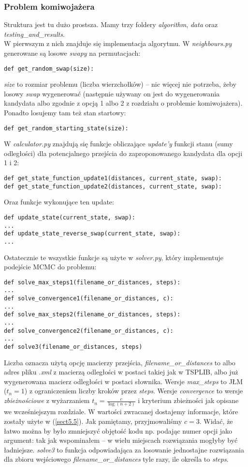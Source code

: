 \documentclass[a4paper]{article}
\theoremstyle{defn}
\theoremstyle{theorem}
\theoremstyle{lemma}
\theoremstyle{cor}
\theoremstyle{fact}
\begin{document}
\subsubsection{Problem komiwojażera}
Struktura jest tu dużo prostsza. Mamy trzy foldery \textit{algorithm}, \textit{data} oraz \textit{testing\_and\_results}.\\
W pierwszym z nich znajduje się implementacja algorytmu. W \textit{neighbours.py} generowane są losowe \textit{swapy} na permutacjach:
\begin{lstlisting}
def get_random_swap(size):
\end{lstlisting}
\textit{size} to rozmiar problemu (liczba wierzchołków) – nic więcej nie potrzeba, żeby losowy \textit{swap} wygenerować (następnie używany on jest do wygenerowania kandydata albo zgodnie z opcją 1 albo 2 z rozdziału o problemie komiwojażera). Ponadto losujemy tam też stan startowy:
\begin{lstlisting}
def get_random_starting_state(size):
\end{lstlisting}
W \textit{calculator.py} znajdują się funkcje obliczające \textit{update'y} funkcji stanu (sumy odległości) dla potencjalnego przejścia do zaproponowanego kandydata dla opcji 1 i 2:
\begin{lstlisting}
def get_state_function_update1(distances, current_state, swap):
def get_state_function_update2(distances, current_state, swap):
\end{lstlisting}
Oraz funkcje wykonujące ten update:
\begin{lstlisting}
def update_state(current_state, swap):
...
def update_state_reverse_swap(current_state, swap):
...
\end{lstlisting}
Ostatecznie te wszystkie funkcje są użyte w \textit{solver.py}, który implementuje podejście MCMC do problemu:
\begin{lstlisting}
def solve_max_steps1(filename_or_distances, steps):
...
def solve_convergence1(filename_or_distances, c):
...
def solve_max_steps2(filename_or_distances, steps):
...
def solve_convergence2(filename_or_distances, c):
...
def solve3(filename_or_distances, steps)
\end{lstlisting}
Liczba oznacza użytą opcję macierzy przejścia, \textit{filename\_or\_distances} to albo adres pliku \textit{.xml} z macierzą odległości w postaci takiej jak w TSPLIB, albo już wygenerowana macierz odległości w postaci słownika. Wersje \textit{max\_steps} to JŁM ($t_n=1$) z ograniczeniem liczby kroków przez \textit{steps}. Wersje \textit{convergence} to wersje \textit{zbieżnościowe} z wyżarzaniem $t_n=\frac{c}{\log(n+2)}$ i kryterium zbieżności jak opisane we wcześniejszym rozdziale. W wartości zwracanej dostajemy informacje, które zostały użyte w (\ref{sect5.5}). Jak pamiętamy, przyjmowaliśmy $c=3$. Widać, że łatwo można by było zmniejszyć objętość kodu np. podając numer opcji jako argument: tak jak wspominałem – w wielu miejscach rozwiązania mogłyby być ładniejsze. \textit{solve3} to funkcja odpowiadająca za losowanie jednostajne rozwiązania dla zbioru wejściowego \textit{filename\_or\_distances} tyle razy, ile określa to \textit{steps}.\\
\end{document}
